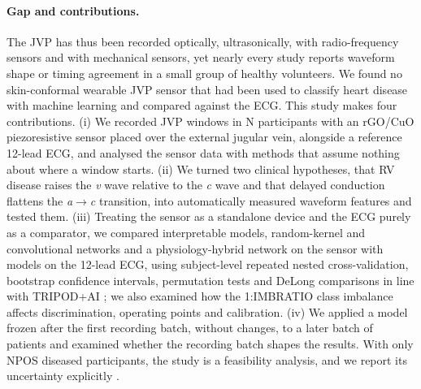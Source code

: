 \documentclass[11pt]{article}
\begin{document}
\paragraph{Gap and contributions.}
The JVP has thus been recorded optically, ultrasonically, with radio-frequency sensors and with mechanical sensors, yet nearly every study reports waveform shape or timing agreement in a small group of healthy volunteers. We found no skin-conformal wearable JVP sensor that had been used to classify heart disease with machine learning and compared against the ECG. This study makes four contributions. (i) We recorded JVP windows in {{N}} participants with an rGO/CuO piezoresistive sensor placed over the external jugular vein, alongside a reference 12-lead ECG, and analysed the sensor data with methods that assume nothing about where a window starts. (ii) We turned two clinical hypotheses, that RV disease raises the \textit{v} wave relative to the \textit{c} wave and that delayed conduction flattens the \textit{a}$\to$\textit{c} transition, into automatically measured waveform features and tested them. (iii) Treating the sensor as a standalone device and the ECG purely as a comparator, we compared interpretable models, random-kernel and convolutional networks and a physiology-hybrid network on the sensor with models on the 12-lead ECG, using subject-level repeated nested cross-validation, bootstrap confidence intervals, permutation tests and DeLong comparisons in line with TRIPOD+AI \cite{collins2024tripod}; we also examined how the 1:{{IMBRATIO}} class imbalance affects discrimination, operating points and calibration. (iv) We applied a model frozen after the first recording batch, without changes, to a later batch of patients and examined whether the recording batch shapes the results. With only {{NPOS}} diseased participants, the study is a feasibility analysis, and we report its uncertainty explicitly \cite{varoquaux2018cross,riley2020calculating}.
\end{document}
